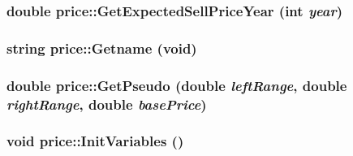 \label{classprice_a9bed928f8d0992ca3dd2f140985427a6}
\hypertarget{classprice_a3ec175e5f77e1c47f377fc5313b7361f}{
\subsubsection[{GetExpectedSellPriceYear}]{\setlength{\rightskip}{0pt plus 5cm}double price::GetExpectedSellPriceYear (int {\em year})}}
\label{classprice_a3ec175e5f77e1c47f377fc5313b7361f}
\hypertarget{classprice_aa5a8b15495994fd4d7c615938f8f76c1}{
\subsubsection[{Getname}]{\setlength{\rightskip}{0pt plus 5cm}string price::Getname (void)}}
\label{classprice_aa5a8b15495994fd4d7c615938f8f76c1}
\hypertarget{classprice_a90af5d98d40acceec149c02cd627e1f5}{
\subsubsection[{GetPseudo}]{\setlength{\rightskip}{0pt plus 5cm}double price::GetPseudo (double {\em leftRange}, \/  double {\em rightRange}, \/  double {\em basePrice})}}
\label{classprice_a90af5d98d40acceec149c02cd627e1f5}
\hypertarget{classprice_a84cb52c47624df899791468c95eb2795}{
\subsubsection[{InitVariables}]{\setlength{\rightskip}{0pt plus 5cm}void price::InitVariables ()}}
\label{classprice_a84cb52c47624df899791468c95eb2795}


